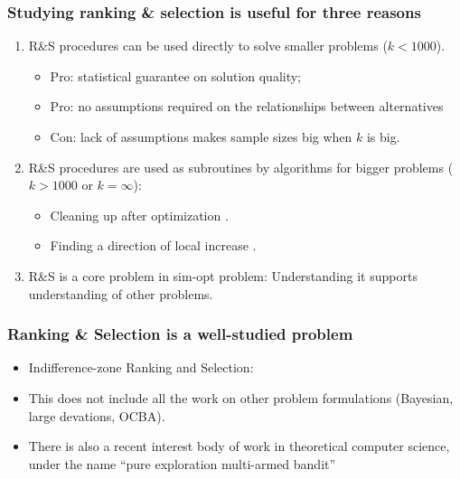 \documentclass[13pt]{beamer}
\begin{document}
\begin{frame} \frametitle{Studying ranking \& selection is useful for three reasons}
\begin{enumerate}
  \item R\&S procedures can be used directly to solve smaller problems ($k<1000$).
    \begin{itemize}
      \item Pro: statistical guarantee on solution quality; 
      \item Pro: no assumptions required on the relationships between alternatives
      \item Con: lack of assumptions makes sample sizes big when $k$ is big.
    \end{itemize}
  \item R\&S procedures are used as subroutines by algorithms for bigger problems ($k>1000$ or $k=\infty$):
    \begin{itemize}
      \item Cleaning up after optimization \cite{Boesel2003}.
      \item Finding a direction of local increase \cite{HongNelson2006,XuNelsonHong2010}.
    \end{itemize}
  \item R\&S is a core problem in sim-opt problem: Understanding it supports understanding of other problems.
\end{enumerate}
\end{frame}


\begin{frame}\frametitle{Ranking \& Selection is a well-studied problem}
  \begin{itemize}
    \item Indifference-zone Ranking and Selection: \cite{Bec54,Pa64,BeKiSo68,Fabian1974,DuDa75,Ri78,BeGo87,Ha88,Ha91,Pa94,BeSaGo95,KiNe01,NeSwGoSo01,Malone2005,Ho06,Dieker2011,Wang2011b,Dieker2012} 
    \item This does not include all the work on other problem formulations (Bayesian, large devations, OCBA).
    \item There is also a recent interest body of work in theoretical computer science, under the name ``pure exploration multi-armed bandit'' \cite{madani2004budgeted,Bubeck2009,audibert2010best,bubeck2011pure}
  \end{itemize}
\end{frame}
\end{document}
